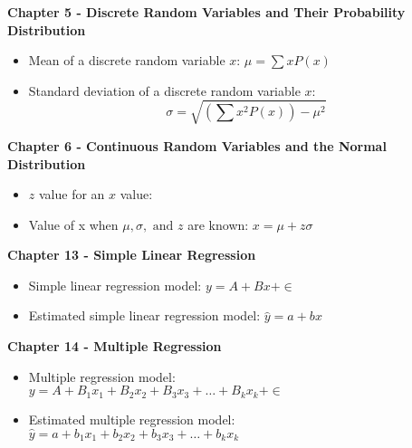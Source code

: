 \documentclass[a4paper, 10pt]{article}
\begin{document}
\begin{multicols}{2}
\textbf{Chapter 5 - Discrete Random Variables and Their Probability Distribution}
\begin{itemize}
	\item Mean of a discrete random variable $x$: $\mu = \sum xP(x)$ 
    \item Standard deviation of a discrete random variable $x$: \\
    	\[ \sigma = \sqrt{(\sum{x^2P(x)}) - \mu^2} \]
\end{itemize}
\textbf{Chapter 6 - Continuous Random Variables and the Normal Distribution}
\begin{itemize}
	\item $z$ value for an $x$ value:  
    \item Value of x when $\mu, \sigma, \textrm{ and } z$ are known: $x = \mu + z\sigma$
\end{itemize}
\textbf{Chapter 13 - Simple Linear Regression}
\begin{itemize}
	\item Simple linear regression model: $y = A + Bx + \in$
    \item Estimated simple linear regression model: $\hat{y} = a + bx$
\end{itemize}
\textbf{Chapter 14 - Multiple Regression}
\begin{itemize}
	\item Multiple regression model: \\ 
    	$y = A + B_1 x_1 + B_2 x_2 + B_3 x_3 + \dots + B_k x_k + \in$
    \item Estimated multiple regression model: \\ 
    	$\hat{y} = a + b_1 x_1 + b_2 x_2 + b_3 x_3 + \dots + b_k x_k$
\end{itemize}
\end{multicols}
\end{document}
